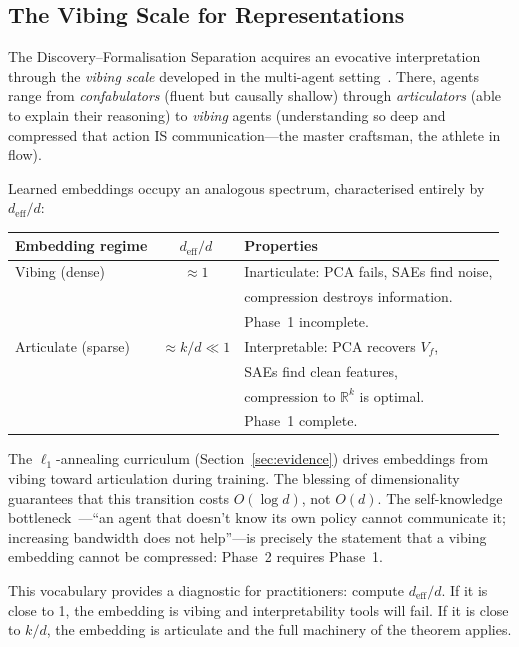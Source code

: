 \documentclass[11pt,a4paper]{article}
\theoremstyle{plain}
\theoremstyle{definition}
\theoremstyle{remark}
\newcommand{\R}{\mathbb{R}}
\newcommand{\deff}{d_{\mathrm{eff}}}
\begin{document}
\subsection{The Vibing Scale for Representations}\label{sec:vibing}

The Discovery--Formalisation Separation acquires an evocative interpretation
through the \emph{vibing scale} developed in the multi-agent
setting~\citep[\S7.8]{omega2026}.  There, agents range from \emph{confabulators}
(fluent but causally shallow) through \emph{articulators} (able to explain
their reasoning) to \emph{vibing} agents (understanding so deep and compressed
that action IS communication---the master craftsman, the athlete in flow).

Learned embeddings occupy an analogous spectrum, characterised entirely by
$\deff/d$:

\begin{center}
\small
\begin{tabular}{@{}lcl@{}}
\toprule
\textbf{Embedding regime} & $\deff/d$ & \textbf{Properties} \\
\midrule
Vibing (dense) & $\approx 1$ & Inarticulate: PCA fails, SAEs find noise,\\
               &             & compression destroys information. \\
               &             & Phase~1 incomplete. \\[3pt]
Articulate (sparse) & $\approx k/d \ll 1$ & Interpretable: PCA recovers $V_f$,\\
               &             & SAEs find clean features,\\
               &             & compression to $\R^k$ is optimal. \\
               &             & Phase~1 complete. \\
\bottomrule
\end{tabular}
\end{center}

The $\ell_1$-annealing curriculum (Section~\ref{sec:evidence}) drives
embeddings from vibing toward articulation during training.  The blessing of
dimensionality guarantees that this transition costs $O(\log d)$, not $O(d)$.
The self-knowledge bottleneck~\citep[Cor.~61]{omega2026}---``an agent that
doesn't know its own policy cannot communicate it; increasing bandwidth does not
help''---is precisely the statement that a vibing embedding cannot be
compressed: Phase~2 requires Phase~1.

This vocabulary provides a diagnostic for practitioners: compute $\deff/d$. If
it is close to 1, the embedding is vibing and interpretability tools will fail.
If it is close to $k/d$, the embedding is articulate and the full machinery of
the theorem applies.
\end{document}
